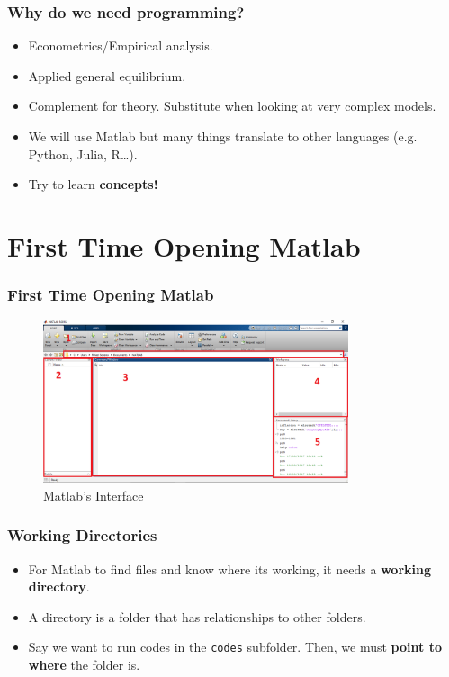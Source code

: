 \documentclass[11pt,xcolor={svgnames},aspectratio=169,usepdftitle=false]{beamer}
\begin{document}
\begin{frame}[c]
  \frametitle{Why do we need programming?}
  
  \begin{itemize}
    \item Econometrics/Empirical analysis.
    \item Applied general equilibrium.
    \item Complement for theory. Substitute when looking at very complex models.
    \item We will use Matlab but many things translate to other languages (e.g. Python, Julia, R\ldots).
    \item Try to learn \alert{\textbf{concepts!}} 
  \end{itemize}

\end{frame}

\section{First Time Opening Matlab}

\begin{frame}
    \frametitle{First Time Opening Matlab}
\begin{figure}
    \centering
    \includegraphics[width = 0.8\textwidth]{../figures/matlab_initial.PNG}
    \caption{Matlab's Interface}
    \label{fig:matlab_interface}
\end{figure}
\end{frame}

\begin{frame}[fragile]
    \frametitle{Working Directories}
\begin{itemize}
    \item For Matlab to find files and know where its working, it needs a \alert{\textbf{working directory}}.
    \item A directory is a folder that has relationships to other folders.
\end{itemize}
\begin{itemize}
    \item Say we want to run codes in the \verb;codes; subfolder. Then, we must \alert{\textbf{point to where}} the folder is.
\end{itemize}
\end{frame}
\end{document}
